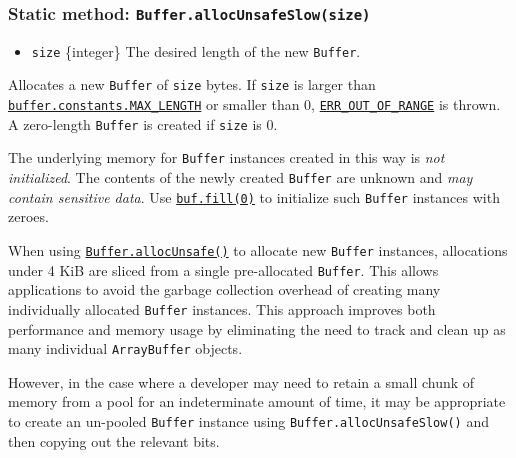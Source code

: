\subsubsection{\texorpdfstring{Static method:
\texttt{Buffer.allocUnsafeSlow(size)}}{Static method: Buffer.allocUnsafeSlow(size)}}\label{static-method-buffer.allocunsafeslowsize}

\begin{itemize}
\tightlist
\item
  \texttt{size} \{integer\} The desired length of the new
  \texttt{Buffer}.
\end{itemize}

Allocates a new \texttt{Buffer} of \texttt{size} bytes. If \texttt{size}
is larger than
\hyperref[bufferconstantsmax_length]{\texttt{buffer.constants.MAX\_LENGTH}}
or smaller than 0,
\href{errors.md\#err_out_of_range}{\texttt{ERR\_OUT\_OF\_RANGE}} is
thrown. A zero-length \texttt{Buffer} is created if \texttt{size} is 0.

The underlying memory for \texttt{Buffer} instances created in this way
is \emph{not initialized}. The contents of the newly created
\texttt{Buffer} are unknown and \emph{may contain sensitive data}. Use
\hyperref[buffillvalue-offset-end-encoding]{\texttt{buf.fill(0)}} to
initialize such \texttt{Buffer} instances with zeroes.

When using
\hyperref[static-method-bufferallocunsafesize]{\texttt{Buffer.allocUnsafe()}}
to allocate new \texttt{Buffer} instances, allocations under 4 KiB are
sliced from a single pre-allocated \texttt{Buffer}. This allows
applications to avoid the garbage collection overhead of creating many
individually allocated \texttt{Buffer} instances. This approach improves
both performance and memory usage by eliminating the need to track and
clean up as many individual \texttt{ArrayBuffer} objects.

However, in the case where a developer may need to retain a small chunk
of memory from a pool for an indeterminate amount of time, it may be
appropriate to create an un-pooled \texttt{Buffer} instance using
\texttt{Buffer.allocUnsafeSlow()} and then copying out the relevant
bits.

